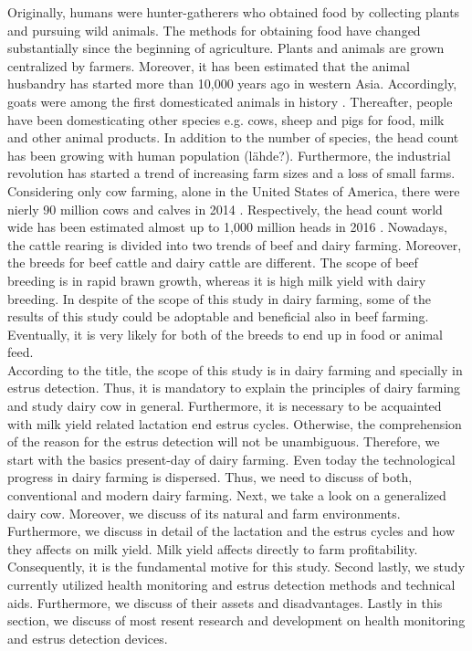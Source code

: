 \documentclass[english,12pt,a4paper,pdftex,elec,utf8]{aaltothesis}
\begin{document}
Originally, humans were hunter-gatherers who obtained food by collecting plants and pursuing wild animals. The methods for obtaining food have changed substantially since the beginning of agriculture. Plants and animals are grown centralized by farmers. Moreover, it has been estimated that the animal husbandry has started more than 10,000 years ago in western Asia. Accordingly, goats were among the first domesticated animals in history \cite{ancienthistoryofmilk}. Thereafter, people have been domesticating other species e.g. cows, sheep and pigs for food, milk and other animal products. In addition to the number of species, the head count has been growing with human population (lähde?). Furthermore, the industrial revolution has started a trend of increasing farm sizes and a loss of small farms. Considering only cow farming, alone in the United States of America, there were nierly 90 million cows and calves in 2014 \cite{agriculturalstatistics2015}. Respectively, the head count world wide has been estimated almost up to 1,000 million heads in 2016 \cite{livestockandpoultry}. Nowadays, the cattle rearing is divided into two trends of beef and dairy farming. Moreover, the breeds for beef cattle and dairy cattle are different. The scope of beef breeding is in rapid brawn growth, whereas it is high milk yield with dairy breeding. In despite of the scope of this study in dairy farming, some of the results of this study could be adoptable and beneficial also in beef farming. Eventually, it is very likely for both of the breeds to end up in food or animal feed. \\


According to the title, the scope of this study is in dairy farming and specially in estrus detection. Thus, it is mandatory to explain the principles of dairy farming and  study dairy cow in general. Furthermore, it is necessary to be acquainted with milk yield related lactation end estrus cycles. Otherwise, the comprehension of the reason for the estrus detection will not be unambiguous. Therefore, we start with the basics present-day of dairy farming. Even today the technological progress in dairy farming is dispersed. Thus, we need to discuss of both, conventional and modern dairy farming. Next, we take a look on a generalized dairy cow. Moreover, we discuss of its natural and farm environments. Furthermore, we discuss in detail of the lactation and the estrus cycles and how they affects on milk yield. Milk yield affects directly to farm profitability. Consequently, it is the fundamental motive for this study. Second lastly, we study currently utilized health monitoring and estrus detection methods and technical aids. Furthermore, we discuss of their assets and disadvantages. Lastly in this section, we discuss of most resent research and development on health monitoring and estrus detection devices.  \\
\end{document}
